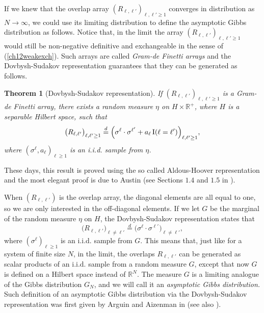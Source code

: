 \documentclass[12pt]{article}
\newcommand{\I}{{\rm I}}
\newcommand{\Reals}{\mathbb{R}}
\newtheorem{theorem}{Theorem}
\theoremstyle{nonumberplain}
\begin{document}
If we knew that the overlap array $(R_{\ell,\ell'})_{\ell,\ell'\geq 1}$ converges in distribution as $N\to\infty$, we could use its limiting distribution to define the asymptotic Gibbs distribution as follows. Notice that, in the limit the array $(R_{\ell,\ell'})_{\ell,\ell'\geq 1}$ would still be non-negative definitive and exchangeable in the sense of (\ref{ch12weakexch}). Such arrays are called \emph{Gram-de Finetti arrays} and the Dovbysh-Sudakov representation \cite{DS} guarantees that they can be generated as follows.\
\begin{theorem}[Dovbysh-Sudakov representation]\label{DSintro}
If $(R_{\ell,\ell'})_{\ell,\ell'\geq 1}$ is a Gram-de Finetti array, there exists a random measure $\eta$ on $H\times \Reals^+$, where $H$ is a separable Hilbert space, such that
\begin{equation}
\bigl(R_{\ell,\ell'}\bigr)_{\ell, \ell'\geq 1}\stackrel{d}{=}
\Bigl(\sigma^{\ell}\cdot \sigma^{\ell'} + a_\ell\, \I(\ell =\ell')\Bigr)_{\ell, \ell'\geq 1},
\label{ch12RDS}
\end{equation}
where $(\sigma^\ell, a_\ell)_{\ell\geq 1}$ is an i.i.d. sample from $\eta$. 
\end{theorem}
These days, this result is proved using the so called Aldous-Hoover representation \cite{Aldous0,Hoover} and the most elegant proof is due to Austin \cite{Austin} (see Sections $1.4$ and $1.5$ in \cite{SKmodel}).

When $(R_{\ell,\ell'})$ is the overlap array, the diagonal elements are all equal to one, so we are only interested in the off-diagonal elements. If we let $G$ be the marginal of the random measure $\eta$ on $H$, the Dovbysh-Sudakov representation states that
$$
\bigl(R_{\ell,\ell'}\bigr)_{\ell\not = \ell'}\stackrel{d}{=}
\bigl(\sigma^{\ell}\cdot \sigma^{\ell'} \bigr)_{\ell \not= \ell'},
$$
where $(\sigma^\ell)_{\ell\geq 1}$ is an i.i.d. sample from $G$. This means that, just like for a system of finite size $N$, in the limit, the overlaps $R_{\ell,\ell'}$ can be generated as scalar products of an i.i.d. sample from a random measure $G$, except that now $G$ is defined on a Hilbert space instead of $\Reals^N$. The measure $G$ is a limiting analogue of the Gibbs distribution $G_N$, and we will call it an \emph{asymptotic Gibbs distribution.} Such definition of an asymptotic Gibbs distribution via the Dovbysh-Sudakov representation was first given by Arguin and Aizenman in \cite{AA} (see also \cite{Arguin}).
\end{document}
